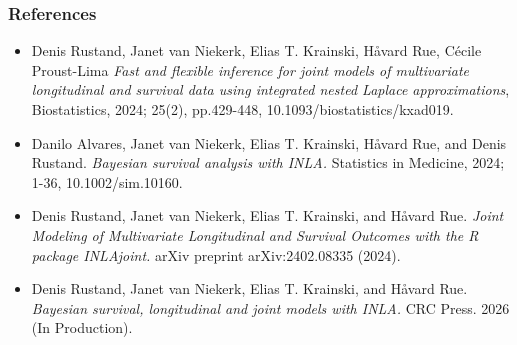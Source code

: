 \documentclass[11pt,
compress,
]{beamer}
\begin{document}
\begin{frame}[fragile]
	\frametitle{References}
	\vspace{-1cm}
	\small
	\begin{itemize}
		\item {\color{red}  Denis Rustand, Janet van Niekerk, Elias T. Krainski, H\aa vard Rue, Cécile Proust-Lima {\color{black} \textit{Fast and flexible inference for joint models of multivariate longitudinal and survival data using integrated nested Laplace approximations}}, Biostatistics, 2024; 25(2), pp.429-448, 10.1093/biostatistics/kxad019.}
		
		\item {\color{red} Danilo  Alvares, Janet van Niekerk, Elias T. Krainski, Håvard Rue, and Denis Rustand. {\color{black} \textit{Bayesian survival analysis with INLA.}}
			Statistics in Medicine, 2024; 1-36, 10.1002/sim.10160.}
		
		\item {\color{red} Denis Rustand, Janet van Niekerk, Elias T. Krainski, and Håvard Rue. {\color{black} \textit{Joint Modeling of Multivariate Longitudinal and Survival Outcomes with the R package INLAjoint.}} arXiv preprint arXiv:2402.08335 (2024).}
		
		\item {\color{red}  Denis Rustand, Janet van Niekerk, Elias T. Krainski, and Håvard Rue. {\color{black} \textit{Bayesian survival, longitudinal and joint models with INLA.}} CRC Press. 2026 (In Production).}
	\end{itemize}
\end{frame}
\end{document}
